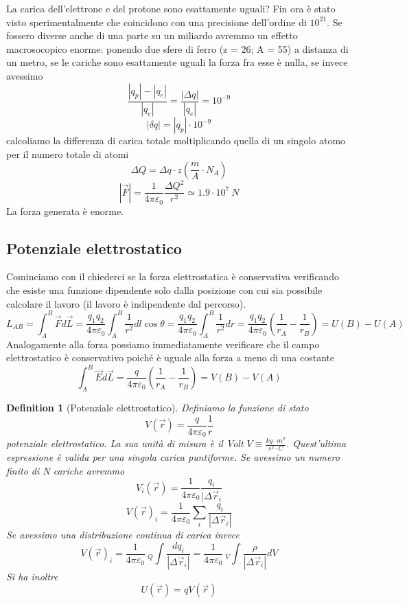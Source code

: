 \documentclass[10pt,a4paper]{article}
\newtheorem{definition}{Definition}
\begin{document}
La carica dell'elettrone e del protone sono esattamente uguali? Fin ora è stato visto sperimentalmente che coincidono con una precisione dell'ordine di \(10^{21}\). Se fossero diverse anche di una parte su un miliardo avremmo un effetto macrosocopico enorme: ponendo due sfere di ferro (z = 26; A = 55) a distanza di un metro, se le cariche sono esattamente uguali la forza fra esse è nulla, se invece avessimo 
\[\frac{|q_p|-|q_e|}{|q_e|} = \frac{|\Delta q|}{|q_e|}=10^{-9}\]
\[|\delta q| = |q_p|\cdot10^{-9}\]
calcoliamo la differenza di carica totale moltiplicando quella di un singolo atomo per il numero totale di atomi
\[\Delta Q = \Delta q\cdot z \left(\frac{m}{A}\cdot N_A\right) \]
\[|\vec{F}|=\frac{1}{4\pi\varepsilon_0}\frac{\Delta Q^2}{r^2}\simeq 1.9\cdot10^{7}\ N\]
La forza generata è enorme. 
\subsection{Potenziale elettrostatico}
Cominciamo con il chiederci se la forza elettrostatica è conservativa verificando che esiste una funzione dipendente solo dalla posizione con cui sia possibile calcolare il lavoro (il lavoro è indipendente dal percorso). 
\[L_{AB} = \int_{A}^{B}\vec{F}d\vec{L}= \frac{q_1q_2}{4\pi\varepsilon_0}\int_{A}^{B}\frac{1}{r^2}dl\cos\theta=\frac{q_1q_2}{4\pi\varepsilon_0}\int_{A}^{B}\frac{1}{r^2}dr=\frac{q_1q_2}{4\pi\varepsilon_0}\left(\frac{1}{r_A}-\frac{1}{r_B}\right)=U(B)-U(A)\]
Analogamente alla forza possiamo immediatamente verificare che il campo elettrostatico è conservativo poiché è uguale alla forza a meno di una costante
\[\int_{A}^{B}\vec{E}d\vec{L}=\frac{q}{4\pi\varepsilon_0}\left(\frac{1}{r_A}-\frac{1}{r_B}\right)=V(B)-V(A)\]
\begin{definition}[Potenziale elettrostatico]
Definiamo la funzione di stato 
\[V(\vec{r}) = \frac{q}{4\pi\varepsilon_0}\frac{1}{r}\]
potenziale elettrostatico. La sua unità di misura è il Volt $V \equiv \frac{kg\cdot m^2}{s^2\cdot C}$.  Quest'ultima espressione è valida per una singola carica puntiforme. Se avessimo un numero finito di N cariche avremmo
\[V_i(\vec{r}) = \frac{1}{4\pi\varepsilon_0}\frac{q_i}{|\Delta \vec{r}_i}\]
\[V(\vec{r})_i= \frac{1}{4\pi\varepsilon_0}\sum_{i}\frac{q_i}{|\Delta \vec{r}_i|}\]
Se avessimo una distribuzione continua di carica invece
\[V(\vec{r})_i= \frac{1}{4\pi\varepsilon_0}\ _Q\int\frac{d q_i}{|\Delta \vec{r}_i|} =  \frac{1}{4\pi\varepsilon_0}\ _V\int\frac{\rho}{|\Delta \vec{r}_i|}dV\]
Si ha inoltre 
\[U(\vec{r})=qV(\vec{r})\]
\end{definition}
\end{document}
